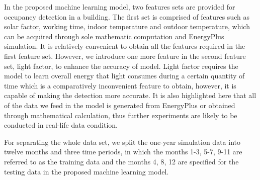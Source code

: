 \textcolor{feb18rev}{In the proposed machine learning model, two features sets
are provided for occupancy detection in a building. The first set is comprised
of features such as solar factor, working time, indoor temperature and outdoor
temperature, which can be acquired through sole mathematic computation and
EnergyPlus simulation.} It is relatively convenient to obtain all the features
required in the first feature set. However, we introduce one more feature in
the second feature set, light factor, to enhance the accuracy of model. Light
factor requires the model to learn overall energy that light consumes during a
certain quantity of time which is a comparatively inconvenient feature to
obtain, however, it is capable of making the detection more accurate. It is
also highlighted here that all of the data we feed in the model is generated
from EnergyPlus or obtained through mathematical calculation, thus further
experiments are likely to be conducted in real-life data condition.

For separating the whole data set, we split the one-year simulation
data into twelve months and three time periods, in which the months
1-3, 5-7, 9-11 are referred to as the training data and the months 4,
8, 12 are specified for the testing data in the proposed machine
learning model.

